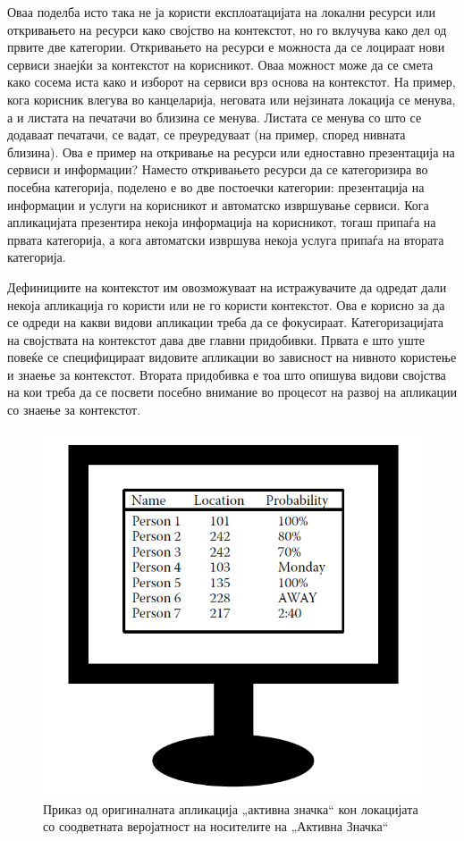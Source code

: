 Оваа поделба исто така не ја користи експлоатацијата на локални ресурси или
откривањето на ресурси како својство на контекстот, но го вклучува како дел од
првите две категории. Откривањето на ресурси е можноста да се лоцираат нови
сервиси знаејќи за контекстот на корисникот. Оваа можност може да се смета како
сосема иста како и изборот на сервиси врз основа на контекстот. На пример, кога
корисник влегува во канцеларија, неговата или нејзината локација се менува, а и
листата на печатачи во близина се менува. Листата се менува со што се додаваат
печатачи, се вадат, се преуредуваат (на пример, според нивната близина). Ова е
пример на откривање на ресурси или едноставно презентација на сервиси и
информации? Наместо откривањето ресурси да се категоризира во посебна
категорија, поделено е во две постоечки категории: презентација на информации и
услуги на корисникот и автоматско извршување сервиси. Кога апликацијата
презентира некоја информација на корисникот, тогаш припаѓа на првата категорија,
а кога автоматски извршува некоја услуга припаѓа на втората категорија.

Дефинициите на контекстот им овозможуваат на истражувачите да одредат дали
некоја апликација го користи или не го користи контекстот. Ова е корисно за да
се одреди на какви видови апликации треба да се фокусираат. Категоризацијата на
својствата на контекстот дава две главни придобивки. Првата е што уште повеќе се
специфицираат видовите апликации во зависност на нивното користење и знаење за
контекстот. Втората придобивка е тоа што опишува видови својства на кои треба да
се посвети посебно внимание во процесот на развој на апликации со знаење за
контекстот.
\begin{figure}[htb]
\centering
\includegraphics[scale=0.4]{images/active_badge}
\caption{Приказ од оригиналната апликација „активна значка“ кон локацијата со
соодветната веројатност на носителите на „Активна Значка“}
\label{fig:active_badge}
\end{figure}

